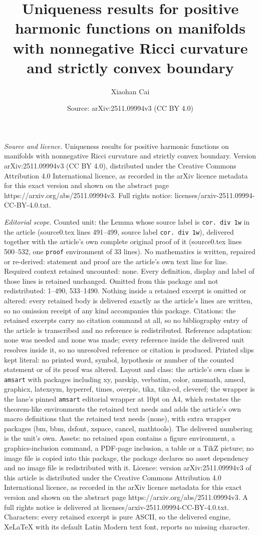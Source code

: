\documentclass[10pt,a4paper]{amsart}
\title[Uniqueness results for positive harmonic functions on manifo]{Uniqueness results for positive harmonic functions on manifolds with nonnegative Ricci curvature and strictly convex boundary}
\author{Xiaohan Cai}
\date{Source: arXiv:2511.09994v3 (CC BY 4.0)}
\begin{document}
\maketitle

\noindent\emph{Source and licence.} Uniqueness results for positive harmonic functions on manifolds with nonnegative Ricci curvature and strictly convex boundary. Version arXiv:2511.09994v3 (CC BY 4.0), distributed under the Creative Commons Attribution 4.0 International licence, as recorded in the arXiv licence metadata for this exact version and shown on the abstract page https://arxiv.org/abs/2511.09994v3. Full rights notice: licenses/arxiv-2511.09994-CC-BY-4.0.txt.\par\smallskip

\noindent\textit{Editorial scope.} Counted unit: the Lemma whose source label is \texttt{cor. div 1w} in the article (source0.tex lines 491--499, source label \texttt{cor. div 1w}), delivered together with the article's own complete original proof of it (source0.tex lines 500--532, one \texttt{proof} environment of 33 lines). No mathematics is written, repaired or re-derived: statement and proof are the article's own text line for line. Required context retained uncounted: none. Every definition, display and label of those lines is retained unchanged. Omitted from this package and not redistributed: 1--490, 533--1490. Nothing inside a retained excerpt is omitted or altered: every retained body is delivered exactly as the article's lines are written, so no omission receipt of any kind accompanies this package. Citations: the retained excerpts carry no citation command at all, so no bibliography entry of the article is transcribed and no reference is redistributed. Reference adaptation: none was needed and none was made; every reference inside the delivered unit resolves inside it, so no unresolved reference or citation is produced. Printed slips kept literal: no printed word, symbol, hypothesis or number of the counted statement or of its proof was altered. Layout and class: the article's own class is \texttt{amsart} with packages including xy, parskip, verbatim, color, amsmath, amscd, graphicx, latexsym, hyperref, times, overpic, tikz, tikz-cd, cleveref; the wrapper is the lane's pinned \texttt{amsart} editorial wrapper at 10pt on A4, which restates the theorem-like environments the retained text needs and adds the article's own macro definitions that the retained text needs (none), with extra wrapper packages (bm, bbm, dsfont, xspace, cancel, mathtools). The delivered numbering is the unit's own. Assets: no retained span contains a figure environment, a graphics-inclusion command, a PDF-page inclusion, a table or a TikZ picture; no image file is copied into this package, the package declares no asset dependency and no image file is redistributed with it. Licence: version arXiv:2511.09994v3 of this article is distributed under the Creative Commons Attribution 4.0 International licence, as recorded in the arXiv licence metadata for this exact version and shown on the abstract page https://arxiv.org/abs/2511.09994v3. A full rights notice is delivered at licenses/arxiv-2511.09994-CC-BY-4.0.txt. Characters: every retained excerpt is pure ASCII, so the delivered engine, XeLaTeX with its default Latin Modern text font, reports no missing character.
\end{document}
